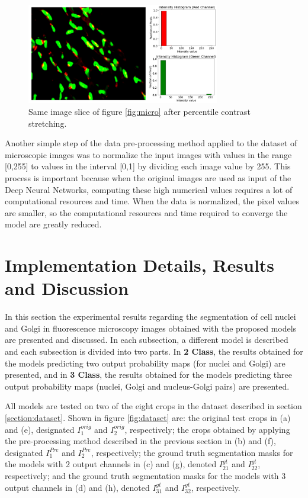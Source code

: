 \begin{figure}[!htb]
  \centering
  \includegraphics[width=0.75\textwidth]{Images/pre.jpg}
  \caption[Same image slice of figure \ref{fig:micro} after percentile contrast stretching.]{Same image slice of figure \ref{fig:micro} after percentile contrast stretching.}
  \label{fig:micro_pre}
\end{figure}


Another simple step of the data pre-processing method applied to the dataset of microscopic images was to normalize the input images with values in the range [0,255] to values in the interval [0,1] by dividing each image value by 255. This process is important because when the original images are used as input of the Deep Neural Networks, computing these high numerical values requires a lot of computational resources and time. When the data is normalized, the pixel values are smaller, so the computational resources and time required to converge the model are greatly reduced.

\section{Implementation Details, Results and Discussion}

In this section the experimental results regarding the segmentation of cell nuclei and Golgi in fluorescence microscopy images obtained with the proposed models are presented and discussed. In each subsection, a different model is described and each subsection is divided into two parts. In \textbf{2 Class}, the results obtained for the models predicting two output probability maps (for nuclei and Golgi) are presented, and in \textbf{3 Class}, the results obtained for the models predicting three output probability maps (nuclei, Golgi and nucleus-Golgi pairs) are presented.

All models are tested on two of the eight crops in the dataset described in section \ref{section:dataset}. Shown in figure \ref{fig:dataset} are: the original test crops in (a) and (e), designated $I^{orig}_1$ and $I^{orig}_2$, respectively; the crops obtained by applying the pre-processing method described in the previous section in (b) and (f), designated $I^{Pre}_1$ and $I^{Pre}_2$, respectively; the ground truth segmentation masks for the models with 2 output channels in (c) and (g), denoted $I^{gt}_{21}$ and $I^{gt}_{22}$, respectively; and the ground truth segmentation masks for the models with 3 output channels in (d) and (h), denoted $I^{gt}_{31}$ and $I^{gt}_{32}$, respectively.

